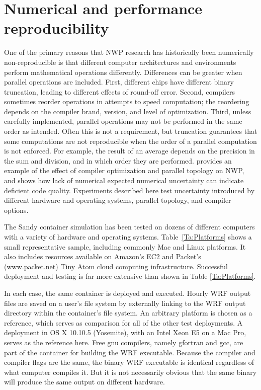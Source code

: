 \documentclass[final]{ametsoc}
\begin{document}
\section{Numerical and performance reproducibility} \label{sec:performance}

One of the primary reasons that NWP research has historically been numerically non-reproducible is that different computer architectures and environments perform mathematical operations differently.  Differences can be greater when parallel operations are included.  First, different chips have different binary truncation, leading to different effects of round-off error. Second, compilers sometimes reorder operations in attempts to speed computation; the reordering depends on the compiler brand, version, and level of optimization.  Third, unless carefully implemented, parallel operations may not be performed in the same order as intended.  Often this is not a requirement, but truncation guarantees that some computations are not reproducible when the order of a parallel computation is not enforced. For example, the result of an average depends on the precision in the sum and division, and in which order they are performed.  \citet{Thomas02} provides an example of the effect of compiler optimization and parallel topology on NWP, and \citet{Baker:2015} shows how lack of numerical expected numerical uncertainty can indicate deficient code quality. Experiments described here test uncertainty introduced by different hardware and operating systems, parallel topology, and compiler options.  

The Sandy container simulation has been tested on dozens of different computers with a variety of hardware and operating systems.  Table~\ref{Ta:Platforms} shows a small representative sample, including commonly Mac and Linux platforms. It also includes resources available on Amazon's EC2 and Packet's (www.packet.net) Tiny Atom cloud computing infrastructure. Successful deployment and testing is far more extensive than shown in Table \ref{Ta:Platforms}. 

In each case, the same container is deployed and executed. Hourly WRF output files are saved on a user's file system by externally linking to the WRF output directory within the container's file system. An arbitrary platform is chosen as  a reference, which serves as comparison for all of the other test deployments. A deployment in OS X 10.10.5 (Yosemite), with an Intel Xeon E5 on a Mac Pro, serves as the reference here. Free gnu compilers, namely gfortran and gcc, are part of the container for building the WRF executable. Because the compiler and compiler flags are the same, the binary WRF executable is identical regardless of what computer compiles it.  But it is not necessarily obvious that the same binary will produce the same output on different hardware.  
\end{document}
